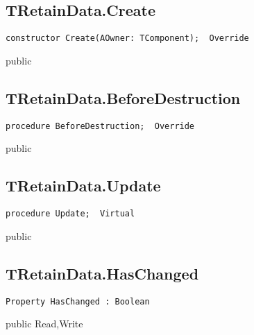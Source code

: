 \subsection{TRetainData.Create}
\label{computer:retain:tretaindata:create}
\begin{FPCList}
\Declaration 

\begin{verbatim}
constructor Create(AOwner: TComponent);  Override
\end{verbatim}
\Visibility
public
\end{FPCList}
\subsection{TRetainData.BeforeDestruction}
\label{computer:retain:tretaindata:beforedestruction}
\begin{FPCList}
\Declaration 

\begin{verbatim}
procedure BeforeDestruction;  Override
\end{verbatim}
\Visibility
public
\end{FPCList}
\subsection{TRetainData.Update}
\label{computer:retain:tretaindata:update}
\begin{FPCList}
\Declaration 

\begin{verbatim}
procedure Update;  Virtual
\end{verbatim}
\Visibility
public
\end{FPCList}
\subsection{TRetainData.HasChanged}
\label{computer:retain:tretaindata:haschanged}
\begin{FPCList}
\Declaration 

\begin{verbatim}
Property HasChanged : Boolean
\end{verbatim}
\Visibility
public
\Access
Read,Write
\end{FPCList}
